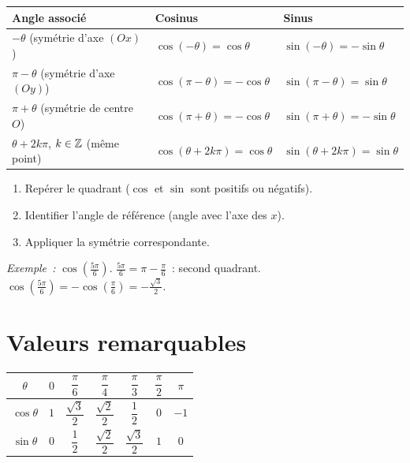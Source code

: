 \begin{prop}
\begin{center}
\renewcommand{\arraystretch}{1.5}
\begin{tabular}{|l|l|l|}
\hline
\rowcolor{BN!10}
Angle associ\'e & Cosinus & Sinus \\
\hline
$-\theta$ (sym\'etrie d'axe $(Ox)$) & $\cos(-\theta)=\cos\theta$ & $\sin(-\theta)=-\sin\theta$ \\
$\pi-\theta$ (sym\'etrie d'axe $(Oy)$) & $\cos(\pi-\theta)=-\cos\theta$ & $\sin(\pi-\theta)=\sin\theta$ \\
$\pi+\theta$ (sym\'etrie de centre $O$) & $\cos(\pi+\theta)=-\cos\theta$ & $\sin(\pi+\theta)=-\sin\theta$ \\
$\theta+2k\pi$, $k\in\mathbb{Z}$ (m\^eme point) & $\cos(\theta+2k\pi)=\cos\theta$ & $\sin(\theta+2k\pi)=\sin\theta$ \\
\hline
\end{tabular}
\end{center}
\end{prop}

\begin{methode}
\begin{enumerate}
  \item Rep\'erer le quadrant ($\cos$ et $\sin$ sont positifs ou n\'egatifs).
  \item Identifier l'angle de r\'ef\'erence (angle avec l'axe des $x$).
  \item Appliquer la sym\'etrie correspondante.
\end{enumerate}
\emph{Exemple~:} $\cos(\frac{5\pi}{6})$.
$\frac{5\pi}{6} = \pi - \frac{\pi}{6}$~: second quadrant.
$\cos(\frac{5\pi}{6}) = -\cos(\frac{\pi}{6}) = -\frac{\sqrt{3}}{2}$.
\end{methode}

\section{Valeurs remarquables}

\begin{prop}
\centering\renewcommand{\arraystretch}{1.8}
\begin{tabular}{|c|cccccc|}
\hline
\rowcolor{BN!12}
$\theta$ & $0$ & $\dfrac{\pi}{6}$ & $\dfrac{\pi}{4}$ & $\dfrac{\pi}{3}$ &
           $\dfrac{\pi}{2}$ & $\pi$ \\
\hline
$\cos\theta$ & $1$ & $\dfrac{\sqrt{3}}{2}$ & $\dfrac{\sqrt{2}}{2}$ &
              $\dfrac{1}{2}$ & $0$ & $-1$ \\[4pt]
$\sin\theta$ & $0$ & $\dfrac{1}{2}$ & $\dfrac{\sqrt{2}}{2}$ &
              $\dfrac{\sqrt{3}}{2}$ & $1$ & $0$ \\[4pt]
\hline
\end{tabular}
\end{prop}

